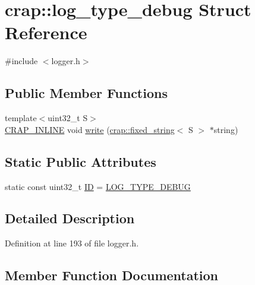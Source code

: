 \hypertarget{structcrap_1_1log__type__debug}{}\section{crap\+:\+:log\+\_\+type\+\_\+debug Struct Reference}
\label{structcrap_1_1log__type__debug}


{\ttfamily \#include $<$logger.\+h$>$}

\subsection*{Public Member Functions}
\begin{DoxyCompactItemize}
\item 
{\footnotesize template$<$uint32\+\_\+t S$>$ }\\\hyperlink{config__x86_8h_a5a40526b8d842e7ff731509998bb0f1c}{C\+R\+A\+P\+\_\+\+I\+N\+L\+I\+N\+E} void \hyperlink{structcrap_1_1log__type__debug_acf418f0c5aca6d864a913fc5438c88ec}{write} (\hyperlink{classcrap_1_1fixed__string}{crap\+::fixed\+\_\+string}$<$ S $>$ $\ast$string)
\end{DoxyCompactItemize}
\subsection*{Static Public Attributes}
\begin{DoxyCompactItemize}
\item 
static const uint32\+\_\+t \hyperlink{structcrap_1_1log__type__debug_adf6c0dc021a9af949aba94d38fa30f05}{I\+D} = \hyperlink{logger_8h_a542529c1654a19379e8db5625bc7801e}{L\+O\+G\+\_\+\+T\+Y\+P\+E\+\_\+\+D\+E\+B\+U\+G}
\end{DoxyCompactItemize}


\subsection{Detailed Description}


Definition at line 193 of file logger.\+h.



\subsection{Member Function Documentation}
\hypertarget{structcrap_1_1log__type__debug_acf418f0c5aca6d864a913fc5438c88ec}{}
